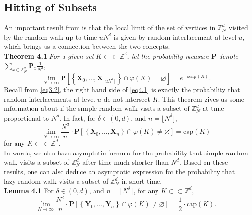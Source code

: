 \documentclass[
11pt, %
a4paper, %
oneside, %
headinclude,footinclude, %
BCOR5mm, %
]{scrartcl}
\begin{document}
\subsection{Hitting of Subsets}
An important result from \cite{drewitz2014introduction} is that the local limit of the set of vertices in $\mathbb{Z}_N^d$ visited by the random walk up to time $uN^d$ is given by random interlacement at level $u$, which brings us a connection between the two concepts. 
\vspace{0.6em}\\\textbf{Theorem 4.1} \textit{For a given set} $K \subset\subset \mathbb{Z}^d$\textit{, let the probability measure} $\mathbf{P}$ \textit{denote} $\sum_{x \in \mathbb{Z}_N^d} \mathbf{P}_x \frac{1}{N^d}$,
\begin{equation}
    \label{eq4.1}
    \lim_{N \rightarrow \infty}\mathbf{P}\left[ \left\{ \mathbf{X}_0,\dots , \mathbf{X}_{\lfloor uN^d \rfloor}\right\} \cap \varphi(K) = \varnothing \right] = e^{-u \text{cap}(K)}. \tag{4.1}
\end{equation}
Recall from \eqref{eq3.2}, the right hand side of \eqref{eq4.1} is exactly the probability that random interlacements at level $u$ do not intersect $K$. This theorem gives us some information about if the simple random walk visits a subset of $\mathbb{Z}_N^d$ at time proportional to $N^d$. In fact, for $\delta \in (0,d)$, and $n=\lfloor N^\delta \rfloor$,
\begin{equation}
    \lim_{N \rightarrow \infty} \frac{N^d}{n} \cdot \mathbf{P}\left[ \left\{ \mathbf{X}_0,\dots,\mathbf{X}_n \right\} \cap \varphi(K)\neq \varnothing \right] = \text{cap}(K) \tag{4.2}
\end{equation}
for any $K \subset\subset \mathbb{Z}^d$.
\vspace{0.6em}\\In words, we also have asymptotic formula for the probability that simple random walk visits a subset of $\mathbb{Z}_N^d$ after time much shorter than $N^d$. Based on these results, one can also deduce an asymptotic expression for the probability that lazy random walk visits a subset of $\mathbb{Z}_N^d$ in short time.
\vspace{0.6em}\\\textbf{Lemma 4.1} For $\delta \in (0,d)$, and $n=\lfloor N^\delta \rfloor$, for any $K \subset\subset \mathbb{Z}^d$,
\begin{equation}
    \lim_{N \rightarrow \infty} \frac{N^d}{n} \cdot \mathbf{P}\left[ \left\{ \mathbf{Y}_0,\dots,\mathbf{Y}_n \right\} \cap \varphi(K)\neq \varnothing \right] = \frac{1}{2} \cdot \text{cap}(K). \tag{4.3}
\end{equation}
\end{document}
